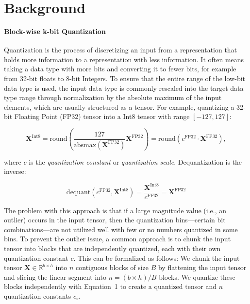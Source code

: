 \section{Background}
\paragraph{Block-wise k-bit Quantization} Quantization is the process of discretizing an input from a representation that holds more information to a representation with less information. It often means taking a data type with more bits and converting it to fewer bits, for example from 32-bit floats to 8-bit Integers. To ensure that the entire range of the low-bit data type is used, the input data type is commonly rescaled into the target data type range through normalization by the absolute maximum of the input elements, which are usually structured as a tensor. For example, quantizing a 32-bit Floating Point (FP32) tensor into a Int8 tensor with range $[-127, 127]$:

\begin{equation}
    \mathbf{X}^{ \text{Int8}} = \text{round}\left( \frac{127}{{\text{absmax}}(\mathbf{X}^{{\text{FP32}}})}\mathbf{X}^{{\text{FP32}}} \right) = \text{round}(c^{\text{FP32}}\cdot \mathbf{X}^{{\text{FP32}}}),
\end{equation}

where $c$ is the {\em quantization constant} or {\em quantization scale}. Dequantization is the inverse:

\begin{equation}
    \text{dequant}(c^{\text{FP32}}, \mathbf{X}^{\text{Int8}}) = \frac{\mathbf{X}^{\text{Int8}}}{c^{\text{FP32}}} = \mathbf{X}^{\text{FP32}}
\end{equation}

The problem with this approach is that if a large magnitude value (i.e., an outlier) occurs in the input tensor, then the quantization bins—certain bit combinations—are not utilized well with few or no numbers quantized in some bins. To prevent the outlier issue, a common approach is to chunk the input tensor into blocks that are independently quantized, each with their own quantization constant $c$. This can be formalized as follows: We chunk the input tensor  $\mathbf{X}\in \mathbb{R}^{b\times h}$ into $n$ contiguous blocks of size $B$ by flattening the input tensor and slicing the linear segment into ${n = ({b\times h} )/{B} }$ blocks. We quantize these blocks independently with Equation~1 to create a quantized tensor and $n$ quantization constants $c_i$.

